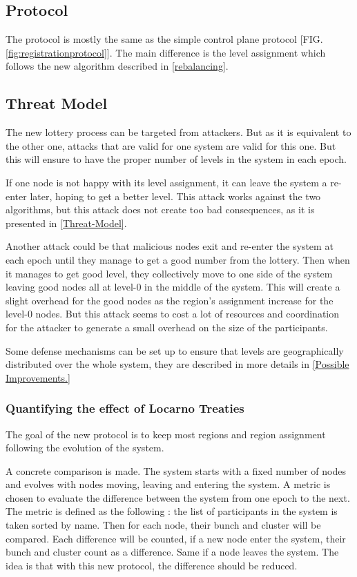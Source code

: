 \documentclass[a4paper,11pt,oneside]{report}
\begin{document}
\subsection{Protocol}
The protocol is mostly the same as the simple control plane protocol [FIG.
\ref{fig:registrationprotocol}]. The main difference is the level assignment
which follows the new algorithm described in \ref{rebalancing}. 

\subsection{Threat Model}

The new lottery process can be targeted from attackers. But as it is equivalent
to the other one, attacks that are valid for one system are valid for this one.
But this will ensure to have the proper number of levels in the system in each
epoch.

If one node is not happy with its level assignment, it can leave the system a
re-enter later, hoping to get a better level. This attack works against the two
algorithms, but this attack does not create too
bad consequences, as it is presented in \ref{Threat-Model}.

Another attack could be that malicious nodes exit and re-enter the system at
each epoch until they manage to get a good number from the lottery. Then when
it manages to get good level, they collectively move to one side of the system
leaving good nodes all at level-0 in the middle of the system. This will create
a slight overhead for the good nodes as the region’s assignment increase for
the level-0 nodes. But this attack seems to cost a lot of resources and
coordination for the attacker to generate a small overhead on the size of the
participants.

Some defense mechanisms can be set up to ensure that levels are geographically
distributed over the whole system, they are described in more details in
\ref{Possible Improvements.} 

\subsubsection{Quantifying the effect of Locarno Treaties}
The goal of the new protocol is to keep most regions and region assignment
following the evolution of the system. 

A concrete comparison is made. The system starts with a fixed number of nodes
and evolves with nodes moving, leaving and entering the system. A metric is
chosen to evaluate the difference between the system from one epoch to the
next. The metric is defined as the following :  the list of participants in the
system is taken sorted by name. Then for each node, their bunch and cluster
will be compared. Each difference will be counted, if a new node enter the
system, their bunch and cluster count as a difference. Same if a node leaves
the system. The idea is that with this new protocol, the difference should be
reduced. 
\end{document}
